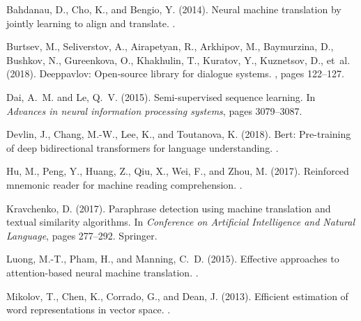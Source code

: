\documentclass{article}
\begin{document}
\begin{thebibliography}{}

Bahdanau, D., Cho, K., and Bengio, Y. (2014).
\newblock Neural machine translation by jointly learning to align and
  translate.
.

Burtsev, M., Seliverstov, A., Airapetyan, R., Arkhipov, M., Baymurzina, D.,
  Bushkov, N., Gureenkova, O., Khakhulin, T., Kuratov, Y., Kuznetsov, D.,
  et~al. (2018).
\newblock Deeppavlov: Open-source library for dialogue systems.
, pages 122--127.

Dai, A.~M. and Le, Q.~V. (2015).
\newblock Semi-supervised sequence learning.
\newblock In {\em Advances in neural information processing systems}, pages
  3079--3087.

Devlin, J., Chang, M.-W., Lee, K., and Toutanova, K. (2018).
\newblock Bert: Pre-training of deep bidirectional transformers for language
  understanding.
.

Hu, M., Peng, Y., Huang, Z., Qiu, X., Wei, F., and Zhou, M. (2017).
\newblock Reinforced mnemonic reader for machine reading comprehension.
.

Kravchenko, D. (2017).
\newblock Paraphrase detection using machine translation and textual similarity
  algorithms.
\newblock In {\em Conference on Artificial Intelligence and Natural Language},
  pages 277--292. Springer.

Luong, M.-T., Pham, H., and Manning, C.~D. (2015).
\newblock Effective approaches to attention-based neural machine translation.
.

Mikolov, T., Chen, K., Corrado, G., and Dean, J. (2013).
\newblock Efficient estimation of word representations in vector space.
.


\end{thebibliography}
\end{document}
